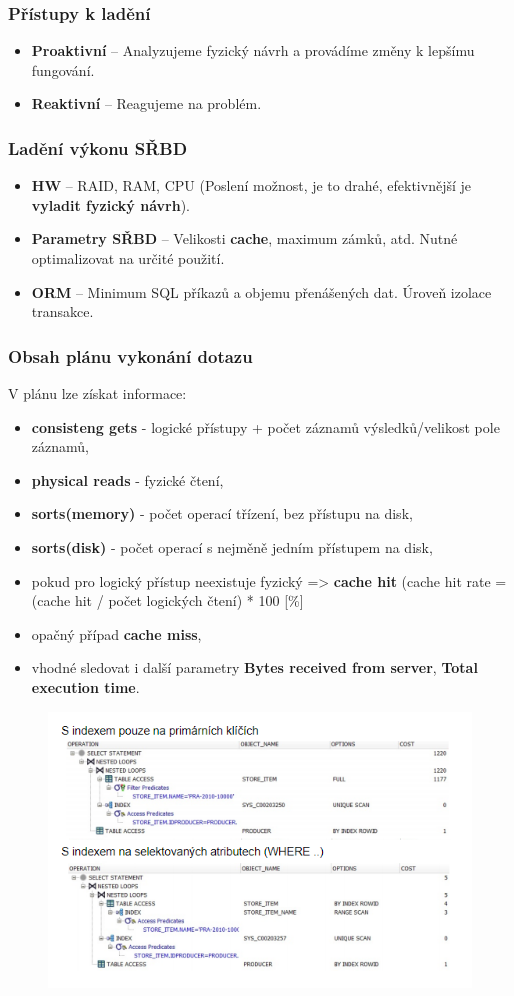 \subsubsection{Přístupy k ladění}
\begin{itemize}
\item \textbf{Proaktivní} -- Analyzujeme fyzický návrh a provádíme změny k lepšímu fungování.
\item \textbf{Reaktivní} -- Reagujeme na problém.
\end{itemize}

\subsubsection{Ladění výkonu SŘBD}
\begin{itemize}
	\item \textbf{HW} -- RAID, RAM, CPU (Poslení možnost, je to drahé, efektivnější je \textbf{vyladit fyzický návrh}).
	\item \textbf{Parametry SŘBD} -- Velikosti \textbf{cache}, maximum zámků, atd. Nutné optimalizovat na určité použití.
	\item \textbf{ORM} -- Minimum SQL příkazů a objemu přenášených dat. Úroveň izolace transakce.
\end{itemize}

\subsubsection{Obsah plánu vykonání dotazu}
V plánu lze získat informace:
\begin{itemize}
	\item \textbf{consisteng gets}  - logické přístupy + počet záznamů výsledků/velikost pole záznamů,
	\item \textbf{physical reads} - fyzické čtení,
	\item \textbf{sorts(memory)} - počet operací třízení, bez přístupu na disk,
	\item \textbf{sorts(disk)} - počet operací s nejměně jedním přístupem na disk,
	\item pokud pro logický přístup neexistuje fyzický => \textbf{cache hit} (cache hit rate = (cache hit / počet logických čtení) * 100 [\%]
	\item opačný případ \textbf{cache miss},
	\item vhodné sledovat i další parametry \textbf{Bytes received from server}, \textbf{Total execution time}.
\end{itemize}

\begin{figure}[H]
	\includegraphics{assets/plan_vykonani_dotazu_oracle.png}
\end{figure}